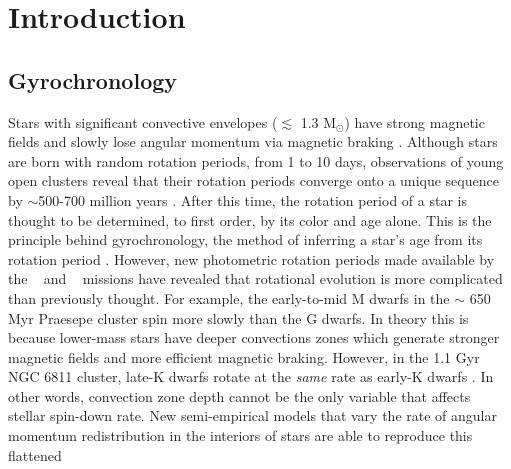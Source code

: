 \section{Introduction}

\subsection{Gyrochronology}

Stars with significant convective envelopes ($\lesssim$ 1.3 M$_\odot$) have
strong magnetic fields and slowly lose angular momentum via magnetic braking
\citep[\eg][]{schatzman1962, weber1967, skumanich1972, kawaler1988,
pinsonneault1989}.
Although stars are born with random rotation periods, from 1 to 10 days,
observations of young open clusters reveal that their rotation periods
converge onto a unique sequence by $\sim$500-700 million years
\citep[\eg][]{irwin2009, gallet2013}.
After this time, the rotation period of a star is thought to be determined, to
first order, by its color and age alone.
This is the principle behind gyrochronology, the method of inferring a
star’s age from its rotation period \citep[\eg][]{barnes2003, barnes2007,
barnes2010, meibom2011, meibom2015}.
However, new photometric rotation periods made available by the \kepler\
\citep{borucki2010} and \ktwo\ \citep{howell2014} missions
\citep[\eg][]{mcquillan2014, garcia2014, douglas2017, rebull2017, meibom2011,
meibom2015, curtis2019} have revealed that rotational evolution is more
complicated than previously thought.
For example, the early-to-mid M dwarfs in the $\sim$ 650 Myr Praesepe cluster
spin more slowly than the G dwarfs.
In theory this is because lower-mass stars have deeper convections zones which
generate stronger magnetic fields and more efficient magnetic braking.
However, in the 1.1 Gyr NGC 6811 cluster, late-K dwarfs rotate at the {\it
same} rate as early-K dwarfs \citep{curtis2019}.
In other words, convection zone depth cannot be the only variable that affects
stellar spin-down rate.
New semi-empirical models that vary the rate of angular momentum
redistribution in the interiors of stars are able to reproduce this flattened

